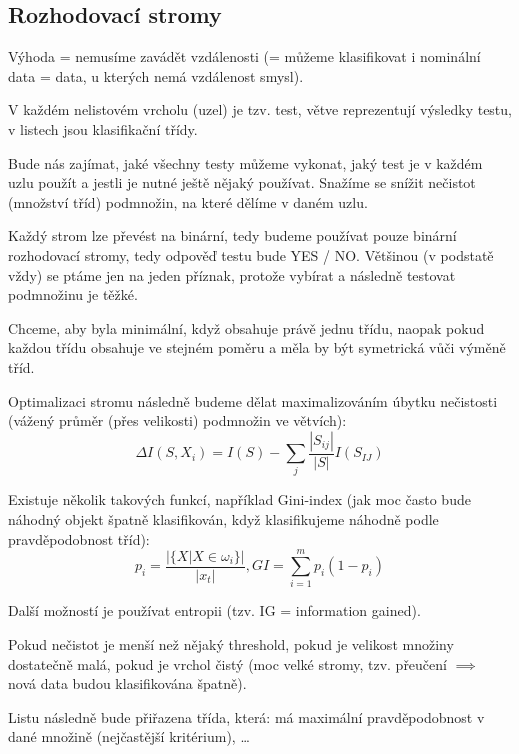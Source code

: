 \documentclass[12pt]{article}					%
\begin{document}
    \subsection{Rozhodovací stromy}
    \begin{definice}
        Výhoda = nemusíme zavádět vzdálenosti (= můžeme klasifikovat i nominální data = data, u kterých nemá vzdálenost smysl).

        V každém nelistovém vrcholu (uzel) je tzv. test, větve reprezentují výsledky testu, v listech jsou klasifikační třídy.

        Bude nás zajímat, jaké všechny testy můžeme vykonat, jaký test je v každém uzlu použít a jestli je nutné ještě nějaký používat. Snažíme se snížit nečistot (množství tříd) podmnožin, na které dělíme v daném uzlu.

        Každý strom lze převést na binární, tedy budeme používat pouze binární rozhodovací stromy, tedy odpověď testu bude YES / NO. Většinou (v podstatě vždy) se ptáme jen na jeden příznak, protože vybírat a následně testovat podmnožinu je těžké.
    \end{definice}

    \begin{definice}
        Chceme, aby byla minimální, když obsahuje právě jednu třídu, naopak pokud každou třídu obsahuje ve stejném poměru a měla by být symetrická vůči výměně tříd.

        Optimalizaci stromu následně budeme dělat maximalizováním úbytku nečistosti (vážený průměr (přes velikosti) podmnožin ve větvích):
        $$ \Delta I(S, X_i) = I(S) - \sum_j \frac{|S_{ij}|}{|S|}I(S_{IJ}) $$ 

        Existuje několik takových funkcí, například Gini-index (jak moc často bude náhodný objekt špatně klasifikován, když klasifikujeme náhodně podle pravděpodobnost tříd):
        $$ p_i = \frac{|\{X|X \in \omega_i\}|}{|x_t|}, GI = \sum_{i = 1}^m p_i (1-p_i) $$

        Další možností je používat entropii (tzv. IG = information gained).
    \end{definice}

    \begin{definice}
        Pokud nečistot je menší než nějaký threshold, pokud je velikost množiny dostatečně malá, pokud je vrchol čistý (moc velké stromy, tzv. přeučení $\implies$ nová data budou klasifikována špatně).

        Listu následně bude přiřazena třída, která: má maximální pravděpodobnost v dané množině (nejčastější kritérium), …
    \end{definice}
\end{document}
